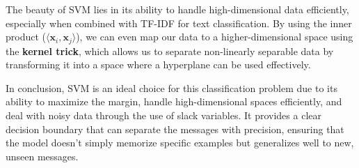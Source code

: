 \documentclass[11pt]{article}
\begin{document}
    The beauty of SVM lies in its ability to handle high-dimensional data
efficiently, especially when combined with TF-IDF for text
classification. By using the inner product
(\(\langle \mathbf{x}_i, \mathbf{x}_j \rangle\)), we can even map our
data to a higher-dimensional space using the \textbf{kernel trick},
which allows us to separate non-linearly separable data by transforming
it into a space where a hyperplane can be used effectively.

In conclusion, SVM is an ideal choice for this classification problem
due to its ability to maximize the margin, handle high-dimensional
spaces efficiently, and deal with noisy data through the use of slack
variables. It provides a clear decision boundary that can separate the
messages with precision, ensuring that the model doesn't simply memorize
specific examples but generalizes well to new, unseen messages.
\end{document}
